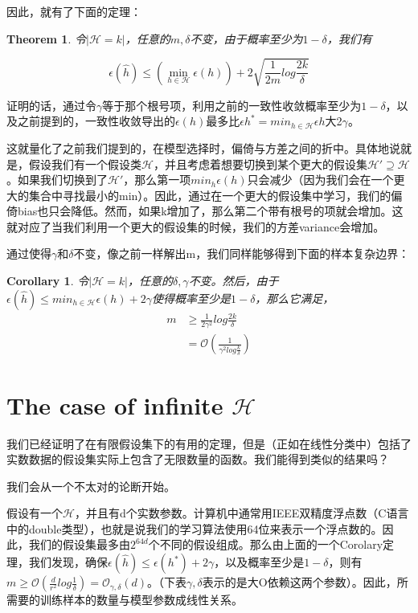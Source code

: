 \documentclass[UTF8]{ctexart}
\begin{document}
因此，就有了下面的定理：
\newtheorem{law3}{Theorem}[section]
\begin{law3} \label{law:box}
令$|\mathcal{H}=k|$，任意的$m,\delta$不变，由于概率至少为$1-\delta$，我们有

\[ \epsilon(\hat{h}) \leq (\mathop{min}\limits_{h\in \mathcal{H}}\epsilon(h))+2\sqrt{\frac{1}{2m}log\frac{2k}{\delta}} \]
\end{law3}

证明的话，通过令$\gamma$等于那个根号项，利用之前的一致性收敛概率至少为$1-\delta$，以及之前提到的，一致性收敛导出的$\epsilon(h)$最多比$\epsilon{h^{*}}=min_{h\in \mathcal{H}}\epsilon{h}$大2$\gamma$。

这就量化了之前我们提到的，在模型选择时，偏倚与方差之间的折中。具体地说就是，假设我们有一个假设类$\mathcal{H}$，并且考虑着想要切换到某个更大的假设集$\mathcal{H'}\supseteq \mathcal{H}$。如果我们切换到了$\mathcal{H'}$，那么第一项$min_{h}\epsilon(h)$只会减少（因为我们会在一个更大的集合中寻找最小的min）。因此，通过在一个更大的假设集中学习，我们的偏倚bias也只会降低。然而，如果k增加了，那么第二个带有根号的项就会增加。这就对应了当我们利用一个更大的假设集的时候，我们的方差variance会增加。

通过使得$\gamma$和$\delta$不变，像之前一样解出m，我们同样能够得到下面的样本复杂边界：


\newtheorem{law4}{Corollary}[section]
\begin{law4} \label{law:box}
令$|\mathcal{H}=k|$，任意的$\delta,\gamma$不变。然后，由于$\epsilon(\hat{h}) \leq min_{h\in \mathcal{H}}\epsilon(h)+2\gamma$使得概率至少是$1-\delta$，那么它满足，
\begin{align*}
m & \geq \frac{1}{2\gamma^{2}}log\frac{2k}{\delta} \\
& = \mathcal{O}(\frac{1}{\gamma^{2}log\frac{k}{\delta}})
\end{align*}
\end{law4}

\section{The case of infinite  $\mathcal{H}$}



我们已经证明了在有限假设集下的有用的定理，但是（正如在线性分类中）包括了实数数据的假设集实际上包含了无限数量的函数。我们能得到类似的结果吗？

我们会从一个不太对的论断开始。

假设有一个$\mathcal{H}$，并且有d个实数参数。计算机中通常用IEEE双精度浮点数（C语言中的double类型），也就是说我们的学习算法使用64位来表示一个浮点数的。因此，我们的假设集最多由$2^{64d}$个不同的假设组成。那么由上面的一个Corolary定理，我们发现，确保$\epsilon(\hat{h}) \leq \epsilon (h^{*}) + 2\gamma$，以及概率至少是$1-\delta$，则有$m \geq \mathcal{O}(\frac{d}{r^{2}}log\frac{1}{\delta})=\mathcal{O}_{\gamma,\delta}(d)$。（下表$\gamma,\delta$表示的是大O依赖这两个参数）。因此，所需要的训练样本的数量与模型参数成线性关系。
\end{document}
